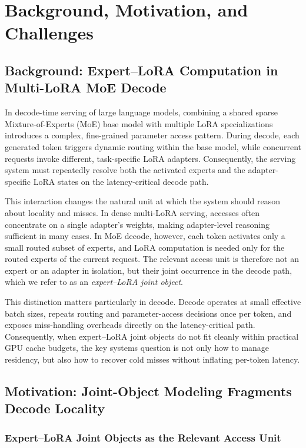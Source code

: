 \documentclass[sigplan,anonymous,review,nonacm]{acmart}
\begin{document}
\section{Background, Motivation, and Challenges}
\label{sec:background}

\subsection{Background: Expert--LoRA Computation in Multi-LoRA MoE Decode}
\label{subsec:background}

In decode-time serving of large language models, combining a shared sparse Mixture-of-Experts (MoE) base model with multiple LoRA specializations introduces a complex, fine-grained parameter access pattern. During decode, each generated token triggers dynamic routing within the base model, while concurrent requests invoke different, task-specific LoRA adapters. Consequently, the serving system must repeatedly resolve both the activated experts and the adapter-specific LoRA states on the latency-critical decode path.

This interaction changes the natural unit at which the system should reason about locality and misses. In dense multi-LoRA serving, accesses often concentrate on a single adapter's weights, making adapter-level reasoning sufficient in many cases. In MoE decode, however, each token activates only a small routed subset of experts, and LoRA computation is needed only for the routed experts of the current request. The relevant access unit is therefore not an expert or an adapter in isolation, but their joint occurrence in the decode path, which we refer to as an \emph{expert--LoRA joint object}.

This distinction matters particularly in decode. Decode operates at small effective batch sizes, repeats routing and parameter-access decisions once per token, and exposes miss-handling overheads directly on the latency-critical path. Consequently, when expert--LoRA joint objects do not fit cleanly within practical GPU cache budgets, the key systems question is not only how to manage residency, but also how to recover cold misses without inflating per-token latency.


\subsection{Motivation: Joint-Object Modeling Fragments Decode Locality}
\label{subsec:motivation}

\subsubsection{Expert--LoRA Joint Objects as the Relevant Access Unit}
\label{subsec:joint-object}
\end{document}
